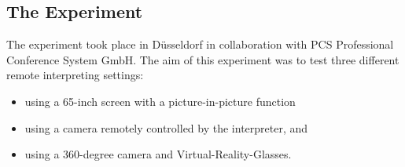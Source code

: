 \documentclass[output=paper]{langsci/langscibook}
\begin{document}
\subsection{The Experiment}
\label{sub:ziegler:6.1}
The experiment took place in Düsseldorf in collaboration with PCS Professional Conference System GmbH. The aim of this experiment was to test three different remote interpreting settings: 

\begin{itemize}
\item using a 65-inch screen with a picture-in-picture function 
\item using a camera remotely controlled by the interpreter, and
\item using a 360-degree camera and Virtual-Reality-Glasses. 
\end{itemize}
\end{document}
